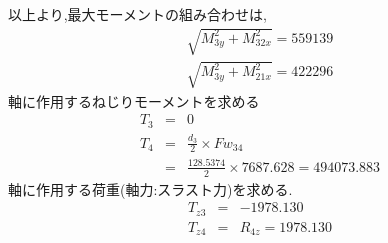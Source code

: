 以上より,最大モーメントの組み合わせは,
\begin{eqnarray}
  \sqrt{ M_{3y}^2 + M_{32x}^2 } = 559139\\
  \sqrt{ M_{3y}^2 + M_{21x}^2 } = 422296
\end{eqnarray}
軸に作用するねじりモーメントを求める
\begin{eqnarray}
T_{3} &=& 0\\
T_{4} &=& \frac{d_3}{2} \times Fw_{34}\\
      &=& \frac{128.5374}{2} \times 7687.628 = 494073.883
\end{eqnarray}
軸に作用する荷重(軸力:スラスト力)を求める.
\begin{eqnarray}
T_{z3} &=& -1978.130\\
T_{z4} &=& R_{4z} = 1978.130
\end{eqnarray}













